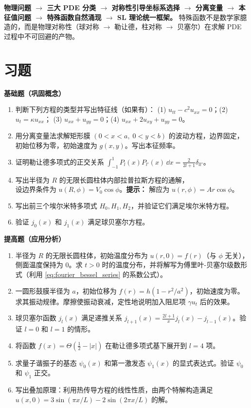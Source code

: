 \begin{insight}[第 4 章的核心思维链条]
\textbf{物理问题 $\to$ 三大 PDE 分类 $\to$ 对称性引导坐标系选择 $\to$ 分离变量 $\to$ 本征值问题 $\to$ 特殊函数自然涌现 $\to$ SL 理论统一框架。} 特殊函数不是数学家臆造的，而是物理对称性（球对称 $\to$ 勒让德，柱对称 $\to$ 贝塞尔）在求解 PDE 过程中不可回避的产物。
\end{insight}

\section*{习题}

\textbf{基础题（巩固概念）}

\begin{enumerate}
\item 判断下列方程的类型并写出特征线（如果有）：
(1) $u_{tt} - c^2 u_{xx} = 0$；(2) $u_t = \kappa u_{xx}$；
(3) $u_{xx} + u_{yy} = 0$；(4) $u_{xx} + 2u_{xy} + u_{yy} = 0$。
\item 用分离变量法求解矩形膜 $(0<x<a,\;0<y<b)$ 的波动方程，边界固定，初始位移为零，初始速度为 $g(x,y)$。写出本征频率。
\item 证明勒让德多项式的正交关系 $\int_{-1}^1 P_l(x)P_{l'}(x)\,\dd x = \frac{2}{2l+1}\delta_{ll'}$。
\item 写出半径为 $R$ 的无限长圆柱体内部拉普拉斯方程的通解，\\ 设边界条件为 $u(R,\phi)=V_0\cos\phi$。\textbf{提示：} 解应为 $u(r,\phi)=Ar\cos\phi$。
\item 写出前三个埃尔米特多项式 $H_0,H_1,H_2$，并验证它们满足埃尔米特方程。
\item 验证 $j_0(x)$ 和 $j_1(x)$ 满足球贝塞尔方程。
\end{enumerate}

\textbf{提高题（应用分析）}

\begin{enumerate}
\item[7.] 半径为 $R$ 的无限长圆柱体，初始温度分布为 $u(r,0)=f(r)$（与 $\phi$ 无关），侧面温度保持为 $0$。求 $t>0$ 时的温度分布，并将解写为傅里叶-贝塞尔级数形式（利用 \eqref{eq:fourier_bessel_series} 的系数公式）。
\item[8.] 一圆形鼓膜半径为 $a$，初始位移为 $f(r) = h(1 - r^2/a^2)$，初始速度为零。求其振动规律。摩擦使振动衰减，定性地说明加入阻尼项 $\gamma u_t$ 后的效果。
\item[9.] 球贝塞尔函数 $j_l(x)$ 满足递推关系 $j_{l+1}(x) = \frac{2l+1}{x}j_l(x) - j_{l-1}(x)$。验证 $l=0$ 和 $l=1$ 的情形。
\item[10.] 将函数 $f(x)=\Theta(\tfrac12-|x|)$ 在勒让德多项式基下展开到 $l=4$ 项。
\item[11.] 求量子谐振子的基态 $\psi_0(x)$ 和第一激发态 $\psi_1(x)$ 的显式表达式。验证 $\psi_0$ 和 $\psi_1$ 正交。
\item[12.] 写出叠加原理：利用热传导方程的线性性质，由两个特解构造满足 $u(x,0)=3\sin(\pi x/L)-2\sin(2\pi x/L)$ 的解。
\end{enumerate}

